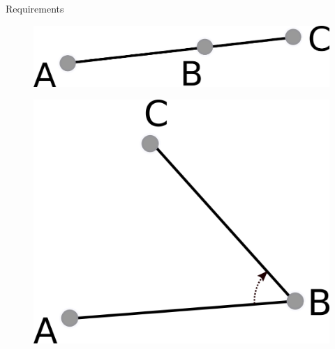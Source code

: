 \documentclass[18pt]{beamer}
\begin{document}
\begin{frame}{Requirements}
\begin{minipage}{.4\textwidth}
\begin{overprint}
   \vspace{0.3cm}
     \begin{figure}
   \centering
  \includegraphics[scale=1.3]{isonline}
 \end{figure}  
 
     \begin{figure}
   \centering
  \includegraphics[scale=1.3]{isleftof}
 \end{figure}  
 
  \end{overprint}
\end{minipage}

\end{frame}
\end{document}
